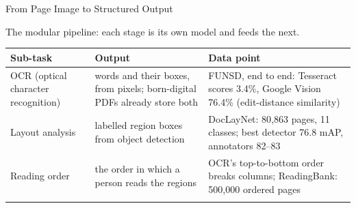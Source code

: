 \begin{frame}{From Page Image to Structured Output}
  \centering
  \\[0.2em]
  {\scriptsize The modular pipeline: each stage is its own model and feeds the next.\par}
  \vspace{0.3em}
  {\scriptsize
  \begin{tabular}{>{\raggedright\arraybackslash}p{2.5cm} >{\raggedright\arraybackslash}p{4.6cm} >{\raggedright\arraybackslash}p{4.8cm}}
    \toprule
    \textbf{Sub-task} & \textbf{Output} & \textbf{Data point} \\
    \midrule
    OCR (optical character recognition) & words and their boxes, from pixels; born-digital PDFs already store both & FUNSD, end to end: Tesseract scores 3.4\%, Google Vision 76.4\% (edit-distance similarity) \\
    \addlinespace[0.15em]
    Layout analysis & labelled region boxes from object detection & DocLayNet: 80{,}863 pages, 11 classes; best detector 76.8 mAP, annotators 82--83 \\
    \addlinespace[0.15em]
    Reading order & the order in which a person reads the regions & OCR's top-to-bottom order breaks columns; ReadingBank: 500{,}000 ordered pages \\
    \addlinespace[0.15em]

\end{tabular}}
\end{frame}
